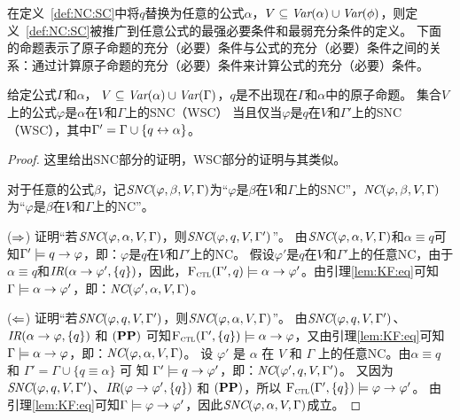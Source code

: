 在定义~\ref{def:NC:SC}中将$q$替换为任意的公式$\alpha$，$V\subseteq \textit{Var}(\alpha) \cup \textit{Var}(\phi)$，则定义~\ref{def:NC:SC}被推广到任意公式的最强必要条件和最弱充分条件的定义。
下面的命题表示了原子命题的充分（必要）条件与公式的充分（必要）条件之间的关系：通过计算原子命题的充分（必要）条件来计算公式的充分（必要）条件。



\begin{proposition}\label{formulaNS_to_p}
	给定公式$\Gamma$和$\alpha$， $V \subseteq \textit{Var}(\alpha) \cup \textit{Var}(\Gamma)$，$q$是不出现在$\Gamma$和$\alpha$中的原子命题。
	集合$V$上的公式$\varphi$是$\alpha$在$V$和$\Gamma$上的SNC（WSC） 当且仅当$\varphi$是$q$在$V$和$\Gamma'$上的SNC（WSC），其中$\Gamma' = \Gamma \cup \{q \leftrightarrow \alpha\}$。
\end{proposition}
\begin{proof}
	这里给出SNC部分的证明，WSC部分的证明与其类似。
	
	对于任意的公式$\beta$，记$\emph{SNC}(\varphi,\beta,V,\Gamma)$为“$\varphi$是$\beta$在$V$和$\Gamma$上的SNC”，$\emph{NC}(\varphi,\beta,V,\Gamma)$为“$\varphi$是$\beta$在$V$和$\Gamma$上的NC”。
	
	
	($\Rightarrow$) 证明“若$\emph{SNC}(\varphi,\alpha,V,\Gamma)$，则$\emph{SNC}(\varphi,q,V,\Gamma')$”。
	由$\emph{SNC}(\varphi,\alpha,V,\Gamma)$和$\alpha\equiv q$可知$\Gamma' \models q\rightarrow \varphi$，即：$\varphi$是$q$在$V$和$\Gamma'$上的NC。
	假设$\varphi'$是$q$在$V$和$\Gamma'$上的任意NC，由于$\alpha\equiv q$和$\emph{IR}(\alpha \rightarrow \varphi', \{q\})$，因此，${\textsc{F}_{\textsc{ctl}}}(\Gamma',q)\models \alpha \rightarrow \varphi'$。由引理\ref{lem:KF:eq}可知$\Gamma \models \alpha \rightarrow \varphi'$，即：$\emph{NC}(\varphi',\alpha,V,\Gamma)$。
	
	
	($\Leftarrow$) 证明“若$\emph{SNC}(\varphi,q,V,\Gamma')$，则$\emph{SNC}(\varphi,\alpha,V,\Gamma)$”。
	由$\emph{SNC}(\varphi,q,V,\Gamma')$、$\emph{IR}(\alpha \rightarrow \varphi, \{q\})$ 和 $(\textbf{PP})$ 可知${\textsc{F}_{\textsc{ctl}}}(\Gamma', \{q\})\models \alpha \rightarrow \varphi$，又由引理\ref{lem:KF:eq}可知$\Gamma \models \alpha \rightarrow \varphi$，即：$\emph{NC}(\varphi,\alpha,V,\Gamma)$。
	设 $\varphi'$ 是 $\alpha$ 在 $V$ 和 $\Gamma$ 上的任意NC。由$\alpha\equiv q$ 和 $\Gamma'=\Gamma \cup \{q\equiv \alpha\}$ 可 知 $\Gamma' \models q \rightarrow \varphi'$，即：$\emph{NC}(\varphi',q,V,\Gamma')$。
	又因为$\emph{SNC}(\varphi,q,V,\Gamma')$、$\emph{IR}(\varphi \rightarrow \varphi', \{q\})$ 和 $(\textbf{PP})$，所以 ${\textsc{F}_{\textsc{ctl}}}(\Gamma', \{q\})\models \varphi \rightarrow \varphi'$。
	由引理\ref{lem:KF:eq}可知$\Gamma \models \varphi \rightarrow \varphi'$，因此$\emph{SNC}(\varphi,\alpha,V, \Gamma)$成立。
\end{proof}

